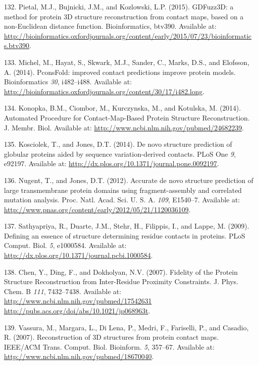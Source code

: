 \documentclass[11pt,a4paper,twoside]{book}
\theoremstyle{definition}
\theoremstyle{definition}
\theoremstyle{remark}
\begin{document}
\hypertarget{ref-Pietal2015a}{}
132. Pietal, M.J., Bujnicki, J.M., and Kozlowski, L.P. (2015). GDFuzz3D:
a method for protein 3D structure reconstruction from contact maps,
based on a non-Euclidean distance function. Bioinformatics, btv390.
Available at:
\url{http://bioinformatics.oxfordjournals.org/content/early/2015/07/23/bioinformatics.btv390}.

\hypertarget{ref-Michel2014}{}
133. Michel, M., Hayat, S., Skwark, M.J., Sander, C., Marks, D.S., and
Elofsson, A. (2014). PconsFold: improved contact predictions improve
protein models. Bioinformatics \emph{30}, i482--i488. Available at:
\url{http://bioinformatics.oxfordjournals.org/content/30/17/i482.long}.

\hypertarget{ref-Konopka2014}{}
134. Konopka, B.M., Ciombor, M., Kurczynska, M., and Kotulska, M.
(2014). Automated Procedure for Contact-Map-Based Protein Structure
Reconstruction. J. Membr. Biol. Available at:
\url{http://www.ncbi.nlm.nih.gov/pubmed/24682239}.

\hypertarget{ref-Kosciolek2014}{}
135. Kosciolek, T., and Jones, D.T. (2014). De novo structure prediction
of globular proteins aided by sequence variation-derived contacts. PLoS
One \emph{9}, e92197. Available at:
\url{http://dx.plos.org/10.1371/journal.pone.0092197}.

\hypertarget{ref-Nugent2012}{}
136. Nugent, T., and Jones, D.T. (2012). Accurate de novo structure
prediction of large transmembrane protein domains using
fragment-assembly and correlated mutation analysis. Proc. Natl. Acad.
Sci. U. S. A. \emph{109}, E1540--7. Available at:
\url{http://www.pnas.org/content/early/2012/05/21/1120036109}.

\hypertarget{ref-Sathyapriya2009}{}
137. Sathyapriya, R., Duarte, J.M., Stehr, H., Filippis, I., and Lappe,
M. (2009). Defining an essence of structure determining residue contacts
in proteins. PLoS Comput. Biol. \emph{5}, e1000584. Available at:
\url{http://dx.plos.org/10.1371/journal.pcbi.1000584}.

\hypertarget{ref-Chen2007}{}
138. Chen, Y., Ding, F., and Dokholyan, N.V. (2007). Fidelity of the
Protein Structure Reconstruction from Inter-Residue Proximity
Constraints. J. Phys. Chem. B \emph{111}, 7432--7438. Available at:
\href{http://www.ncbi.nlm.nih.gov/pubmed/17542631\%20http://pubs.acs.org/doi/abs/10.1021/jp068963t}{http://www.ncbi.nlm.nih.gov/pubmed/17542631 http://pubs.acs.org/doi/abs/10.1021/jp068963t}.

\hypertarget{ref-Vassura2007}{}
139. Vassura, M., Margara, L., Di Lena, P., Medri, F., Fariselli, P.,
and Casadio, R. (2007). Reconstruction of 3D structures from protein
contact maps. IEEE/ACM Trans. Comput. Biol. Bioinform. \emph{5},
357--67. Available at:
\url{http://www.ncbi.nlm.nih.gov/pubmed/18670040}.
\end{document}
